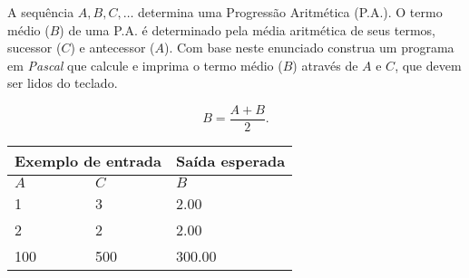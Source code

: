 \item A sequência $A, B, C, \ldots$ determina uma Progressão Aritmética (P.A.).
O termo médio ($B$) de uma P.A. é determinado pela média aritmética de seus
termos, sucessor ($C$) e antecessor ($A$). Com base neste enunciado construa
um programa em \emph{Pascal} que calcule e imprima o termo médio ($B$)
através de $A$ e $C$, que devem ser lidos do teclado.

\[
B = \frac{A+B}{2}.
\]

\begin{center}
\begin{tabular}{|l|l|l|} \hline
\multicolumn{2}{|c|}{Exemplo de entrada} & Saída esperada \\ \hline
$A$ & $C$    & $B$               \\ \hline
1 & 3        & 2.00                \\ \hline
2 & 2        & 2.00             \\ \hline
100 & 500    & 300.00          \\ \hline
\end{tabular}
\end{center}
